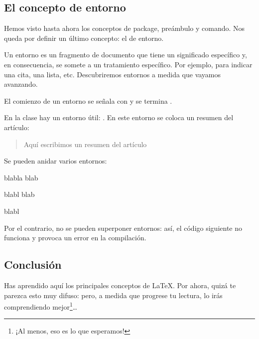 \subsection{El concepto de entorno}

Hemos visto hasta ahora los conceptos de package, preámbulo y comando. Nos queda por definir un último concepto: el de entorno.

Un entorno es un fragmento de documento que tiene un significado específico y, en consecuencia, se somete a un tratamiento específico. Por ejemplo, para indicar una cita, una lista, etc. Descubriremos entornos a medida que vayamos avanzando. 


El comienzo de un entorno se señala   con  y se termina .

En la clase  hay un entorno útil: . En este entorno se coloca un resumen del artículo:

\begin{latexcode}
\begin{abstract}
Aquí escribimos un resumen del artículo 
\end{abstract}
\end{latexcode}


Se pueden anidar varios entornos:

\begin{latexcode}
\begin{1}
blabla blab
\begin{2}
blabl blab
\end{2}
blabl
\end{1}
\end{latexcode}

Por el contrario, no se pueden superponer entornos: así, el código siguiente no funciona y provoca un error en la compilación.



\subsection{Conclusión}

Has aprendido aquí los principales conceptos de \LaTeX. 
 Por ahora, quizá te parezca esto muy difuso: pero, a medida que progrese tu lectura, lo irás comprendiendo mejor\footnote{¡Al menos, eso es lo que esperamos!}\ldots


